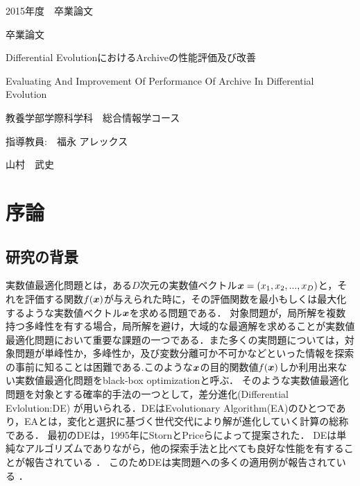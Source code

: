 \documentclass[a4paper,11pt,oneside,openany]{jsbook}
\def\vector#1{\mbox{\boldmath $#1$}}
\begin{document}
\thispagestyle{empty}
2015年度　卒業論文%
\bigskip%
\LARGE%
\begin{center}
卒業論文
\end{center}
\bigskip\bigskip\bigskip\bigskip\bigskip\bigskip\bigskip %
\begin{center} %
Differential EvolutionにおけるArchiveの性能評価及び改善
\end{center}
\large %
\begin{center}
Evaluating And Improvement Of Performance Of Archive In Differential Evolution
\end{center}
\bigskip\bigskip\bigskip\bigskip\bigskip\bigskip\bigskip\bigskip\bigskip\bigskip
\bigskip\bigskip\bigskip\bigskip\bigskip\bigskip\bigskip\bigskip\bigskip
\Large %
\begin{center}
教養学部学際科学科　総合情報学コース
\end{center}
\Large %
\begin{center}
指導教員:　福永 アレックス
\end{center}
\LARGE %
\begin{center}
山村　武史
\end{center}
\normalsize
\thispagestyle{empty}
\tableofcontents

\chapter{序論}
\section{研究の背景}
実数値最適化問題とは，ある$D$次元の実数値ベクトル$\vector{x} = (x_1, x_2, ..., x_D)$と，それを評価する関数$f(\vector{x})$が与えられた時に，その評価関数を最小もしくは最大化するような実数値ベクトル$\vector{x}$を求める問題である．
対象問題が，局所解を複数持つ多峰性を有する場合，局所解を避け，大域的な最適解を求めることが実数値最適化問題において重要な課題の一つである．また多くの実問題については，対象問題が単峰性か，多峰性か，及び変数分離可か不可かなどといった情報を探索の事前に知ることは困難である.このような$\vector{x}$の目的関数値$f(\vector{x})$しか利用出来ない実数値最適化問題をblack-box optimizationと呼ぶ．
そのような実数値最適化問題を対象とする確率的手法の一つとして，差分進化(Differential Evlolution:DE) \cite{Storn} が用いられる．DEはEvolutionary Algorithm(EA)のひとつであり，EAとは，変化と選択に基づく世代交代により解が進化していく計算の総称である．
最初のDEは，1995年にStornとPriceらによって提案された．
DEは単純なアルゴリズムでありながら，他の探索手法と比べても良好な性能を有することが報告されている
 \cite{Storn} \cite{ExDE} ．
このためDEは実問題への多くの適用例が報告されている \cite{ExDE} ．
\end{document}

